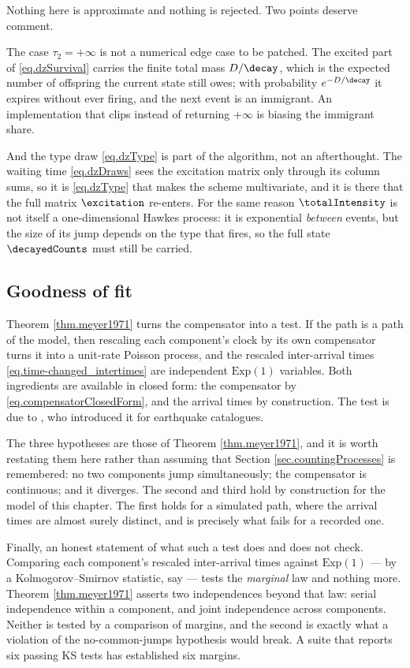 Nothing here is approximate and nothing is rejected.
Two points deserve comment.

The case $\tau_2 = +\infty$ is not a numerical edge case to be patched.
The excited part of \eqref{eq.dzSurvival} carries the finite total mass $D/\decay$,
which is the expected number of offspring the current state still owes;
with probability $e^{-D/\decay}$ it expires without ever firing,
and the next event is an immigrant.
An implementation that clips instead of returning $+\infty$ is biasing the immigrant share.

And the type draw \eqref{eq.dzType} is part of the algorithm, not an afterthought.
The waiting time \eqref{eq.dzDraws} sees the excitation matrix only through its column sums,
so it is \eqref{eq.dzType} that makes the scheme multivariate,
and it is there that the full matrix $\excitation$ re-enters.
For the same reason $\totalIntensity$ is not itself a one-dimensional Hawkes process:
it is exponential \emph{between} events, but the size of its jump depends on the type that
fires, so the full state $\decayedCounts$ must still be carried.

\subsection{Goodness of fit}

Theorem \ref{thm.meyer1971} turns the compensator into a test.
If the path is a path of the model, then rescaling each component's clock by its own
compensator turns it into a unit-rate Poisson process,
and the rescaled inter-arrival times \eqref{eq.time-changed_intertimes} are independent
$\text{Exp}(1)$ variables.
Both ingredients are available in closed form:
the compensator by \eqref{eq.compensatorClosedForm},
and the arrival times by construction.
The test is due to \cite{Oga88sta}, who introduced it for earthquake catalogues.

The three hypotheses are those of Theorem \ref{thm.meyer1971},
and it is worth restating them here rather than assuming that
Section \ref{sec.countingProcesses} is remembered:
no two components jump simultaneously;
the compensator is continuous;
and it diverges.
The second and third hold by construction for the model of this chapter.
The first holds for a simulated path, where the arrival times are almost surely distinct,
and is precisely what fails for a recorded one.

Finally, an honest statement of what such a test does and does not check.
Comparing each component's rescaled inter-arrival times against $\text{Exp}(1)$ ---
by a Kolmogorov--Smirnov statistic, say --- tests the \emph{marginal} law and nothing more.
Theorem \ref{thm.meyer1971} asserts two independences beyond that law:
serial independence within a component, and joint independence across components.
Neither is tested by a comparison of margins,
and the second is exactly what a violation of the no-common-jumps hypothesis would break.
A suite that reports six passing KS tests has established six margins.
